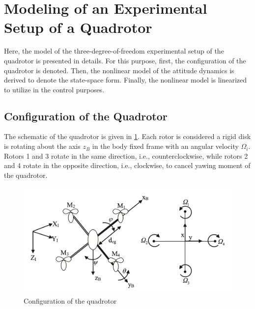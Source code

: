 \documentclass[conference]{IEEEtran}
\begin{document}
\section{Modeling of an Experimental Setup of a Quadrotor}\label{sec:modeling}
\noindent Here, the model of the three-degree-of-freedom experimental setup of the quadrotor is presented in details. For this purpose, first, the configuration of the quadrotor is denoted. Then, the nonlinear model of the attitude dynamics is derived to denote the state-space form. Finally, the nonlinear model is linearized to utilize in the control purposes.
\subsection{Configuration of the Quadrotor }
\noindent The schematic of the quadrotor is given in \figurename{\ref{QuadAssum}}. Each rotor is considered a rigid disk is rotating about the axis $z_B$ in the body fixed frame with an angular velocity $\Omega_i$.
Rotors 1 and 3 rotate in the same direction, i.e., counterclockwise, while rotors 2 and 4 rotate in the opposite direction, i.e., clockwise, to cancel yawing moment of the quadrotor.
\vspace{-0.5cm}
\begin{figure}[!h]
	\includegraphics[width=\linewidth]{../Figures/introduction/schematic.png}
	\centering
	\caption{Configuration of the quadrotor}
	\label{QuadAssum}
\end{figure}
\end{document}
